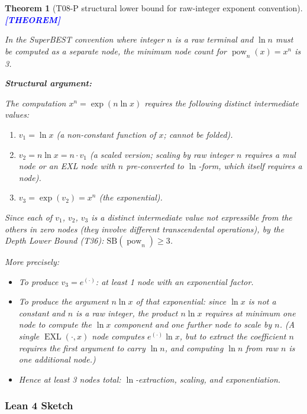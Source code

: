\documentclass[12pt,a4paper]{article}
\newtheorem{theorem}{Theorem}[section]
\theoremstyle{definition}
\newcommand{\EXL}{\operatorname{EXL}}
\newcommand{\prooflabel}[1]{%
  \noindent\textbf{\textcolor{blue}{[#1]}}%
}
\newcommand{\SB}{\mathrm{SB}}
\newcommand{\pow}{\operatorname{pow}}
\begin{document}
\begin{theorem}[T08-P structural lower bound for raw-integer exponent convention]
\label{thm:pow-raw}
\prooflabel{THEOREM}

In the SuperBEST convention where integer $n$ is a raw terminal and $\ln n$ must
be computed as a separate node, the minimum node count for $\pow_n(x)=x^n$ is 3.

\medskip
\noindent\textbf{Structural argument:}

The computation $x^n = \exp(n\ln x)$ requires the following distinct intermediate values:
\begin{enumerate}
  \item $v_1 = \ln x$ (a non-constant function of $x$; cannot be folded).
  \item $v_2 = n\ln x = n\cdot v_1$ (a scaled version; scaling by raw integer $n$
        requires a mul node or an EXL node with $n$ pre-converted to $\ln$-form,
        which itself requires a node).
  \item $v_3 = \exp(v_2) = x^n$ (the exponential).
\end{enumerate}
Since each of $v_1$, $v_2$, $v_3$ is a distinct intermediate value not expressible
from the others in zero nodes (they involve different transcendental operations),
by the Depth Lower Bound (T36): $\SB(\pow_n)\geq 3$.

More precisely:
\begin{itemize}
  \item To produce $v_3 = e^{(\cdot)}$: at least 1 node with an exponential factor.
  \item To produce the argument $n\ln x$ of that exponential: since $\ln x$ is not
        a constant and $n$ is a raw integer, the product $n\ln x$ requires at minimum
        one node to compute the $\ln x$ component and one further node to scale by $n$.
        (A single $\EXL(\cdot, x)$ node computes $e^{(\cdot)}\ln x$, but to extract
        the coefficient $n$ requires the first argument to carry $\ln n$, and computing
        $\ln n$ from raw $n$ is one additional node.)
  \item Hence at least 3 nodes total: $\ln$-extraction, scaling, and exponentiation.
\end{itemize}
\end{theorem}

\subsubsection{Lean 4 Sketch}
\end{document}
